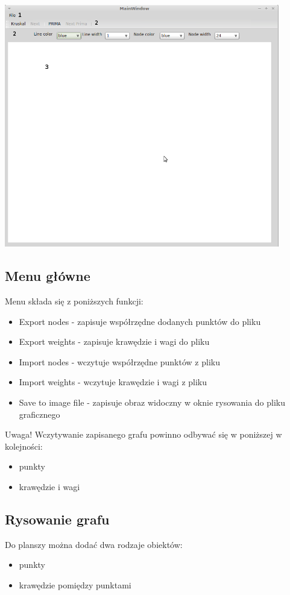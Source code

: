 \documentclass[paper=a4, fontsize=11pt]{scrartcl} %
\numberwithin{equation}{section} %
\numberwithin{figure}{section} %
\numberwithin{table}{section} %
\begin{document}
\begin{center}
\includegraphics[width=12cm]{main_window.png}

\end{center}
\subsection{Menu główne}

Menu składa się z poniższych funkcji:
\begin{itemize}
\item Export nodes - zapisuje współrzędne dodanych punktów do pliku
\item Export weights - zapisuje krawędzie i wagi do pliku
\item Import nodes - wczytuje współrzędne punktów z pliku
\item Import weights - wczytuje krawędzie i wagi z pliku
\item Save to image file - zapisuje obraz widoczny w oknie rysowania do pliku graficznego
\end{itemize}

Uwaga! Wczytywanie zapisanego grafu powinno odbywać się w poniższej w kolejności:
\begin{itemize}
\item punkty
\item krawędzie i wagi
\end{itemize}

\subsection{Rysowanie grafu}
Do planszy można dodać dwa rodzaje obiektów:
\begin{itemize}
\item punkty
\item krawędzie pomiędzy punktami
\end{itemize}
\end{document}
